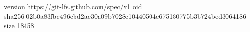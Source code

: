 version https://git-lfs.github.com/spec/v1
oid sha256:02b0a83fbc496cbd2ac30a09b7028e10440504e675180775b3b724bed3064186
size 18458
